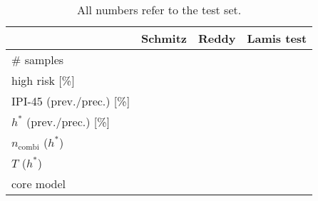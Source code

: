 \begin{table}[ht]
    \small
    \centering
    \begin{tabular}{L{.18\textwidth}||R{.2\textwidth}|R{.28\textwidth}|R{.18\textwidth}}
        & Schmitz & Reddy & Lamis test \\
        \hline
        \# samples & & & \\
        high risk [\%] & & & \\
        IPI-45 (prev./prec.) [\%] & & & \\
        $h^*$ (prev./prec.) [\%] & & & \\
        $n_\text{combi}$ ($h^*$)& & & \\
        $T$ ($h^*$) & & & \\
        core model & & & \\
    \end{tabular}
    \caption{All numbers refer to the test set.}
\end{table}